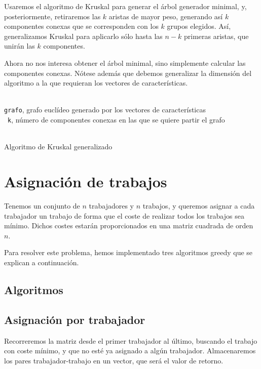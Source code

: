 \documentclass[a4paper, 11pt]{article} %
\let\emptyset\varnothing
\begin{document}
    Usaremos el algoritmo de Kruskal para generar el árbol generador minimal, y, posteriormente, retiraremos las $k$
    aristas de mayor peso, generando así $k$ componentes conexas que se corresponden con los $k$ grupos elegidos. Así,
    generalizamos Kruskal para aplicarlo sólo hasta las $n-k$ primeras aristas, que unirán las $k$ componentes.
    
    Ahora no nos interesa obtener el árbol minimal, sino simplemente calcular las componentes conexas. Nótese además
    que debemos generalizar la dimensión del algoritmo a la que requieran los vectores de características.
    
    \begin{algorithm}[H]
	\begin{algorithmic}[1]
		\REQUIRE \ \\
        	\texttt{grafo}, grafo euclídeo generado por los vectores de características \\\
        	\texttt{k}, número de componentes conexas en las que se quiere partir el grafo \\\
		\STATE{\texttt{componentes=}$\emptyset$}
		\FORALL{\texttt{v} en \texttt{grafo.vértices}:}
		\ENDFOR
		    \ENDIF
		\ENDFOR
	\end{algorithmic}
      \caption{Algoritmo de Kruskal generalizado}
      \label{kruskal-generalizado}
    \end{algorithm}


    
\section{Asignación de trabajos}
Tenemos un conjunto de $n$ trabajadores y $n$ trabajos, y queremos asignar a cada trabajador un trabajo de forma
que el coste de realizar todos los trabajos sea mínimo. Dichos costes estarán proporcionados en una matriz cuadrada
de orden $n$.

Para resolver este problema, hemos implementado tres algoritmos greedy que se explican a continuación. 
	\subsection{Algoritmos}
		\subsection{Asignación por trabajador}
		Recorreremos la matriz desde el primer trabajador al último, buscando el trabajo con coste mínimo, y que no esté ya 
		asignado a algún trabajador. Almacenaremos los pares trabajador-trabajo en un vector, que será el valor de retorno. 
		
\end{document}

